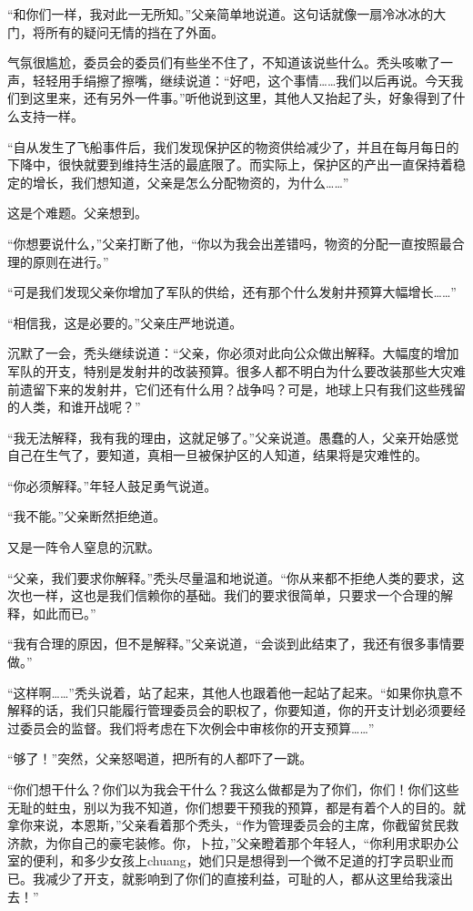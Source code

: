 “和你们一样，我对此一无所知。”父亲简单地说道。这句话就像一扇冷冰冰的大门，将所有的疑问无情的挡在了外面。

气氛很尴尬，委员会的委员们有些坐不住了，不知道该说些什么。秃头咳嗽了一声，轻轻用手绢擦了擦嘴，继续说道：“好吧，这个事情……我们以后再说。今天我们到这里来，还有另外一件事。”听他说到这里，其他人又抬起了头，好象得到了什么支持一样。

“自从发生了飞船事件后，我们发现保护区的物资供给减少了，并且在每月每日的下降中，很快就要到维持生活的最底限了。而实际上，保护区的产出一直保持着稳定的增长，我们想知道，父亲是怎么分配物资的，为什么……”

这是个难题。父亲想到。

“你想要说什么，”父亲打断了他，“你以为我会出差错吗，物资的分配一直按照最合理的原则在进行。”

“可是我们发现父亲你增加了军队的供给，还有那个什么发射井预算大幅增长……”

“相信我，这是必要的。”父亲庄严地说道。

沉默了一会，秃头继续说道：“父亲，你必须对此向公众做出解释。大幅度的增加军队的开支，特别是发射井的改装预算。很多人都不明白为什么要改装那些大灾难前遗留下来的发射井，它们还有什么用？战争吗？可是，地球上只有我们这些残留的人类，和谁开战呢？”

“我无法解释，我有我的理由，这就足够了。”父亲说道。愚蠢的人，父亲开始感觉自己在生气了，要知道，真相一旦被保护区的人知道，结果将是灾难性的。

“你必须解释。”年轻人鼓足勇气说道。

“我不能。”父亲断然拒绝道。

又是一阵令人窒息的沉默。

“父亲，我们要求你解释。”秃头尽量温和地说道。“你从来都不拒绝人类的要求，这次也一样，这也是我们信赖你的基础。我们的要求很简单，只要求一个合理的解释，如此而已。”

“我有合理的原因，但不是解释。”父亲说道，“会谈到此结束了，我还有很多事情要做。”

“这样啊……”秃头说着，站了起来，其他人也跟着他一起站了起来。“如果你执意不解释的话，我们只能履行管理委员会的职权了，你要知道，你的开支计划必须要经过委员会的监督。我们将考虑在下次例会中审核你的开支预算……”

“够了！”突然，父亲怒喝道，把所有的人都吓了一跳。

“你们想干什么？你们以为我会干什么？我这么做都是为了你们，你们！你们这些无耻的蛀虫，别以为我不知道，你们想要干预我的预算，都是有着个人的目的。就拿你来说，本恩斯，”父亲看着那个秃头，“作为管理委员会的主席，你截留贫民救济款，为你自己的豪宅装修。你，卜拉，”父亲瞪着那个年轻人，“你利用求职办公室的便利，和多少女孩上chuang，她们只是想得到一个微不足道的打字员职业而已。我减少了开支，就影响到了你们的直接利益，可耻的人，都从这里给我滚出去！”

